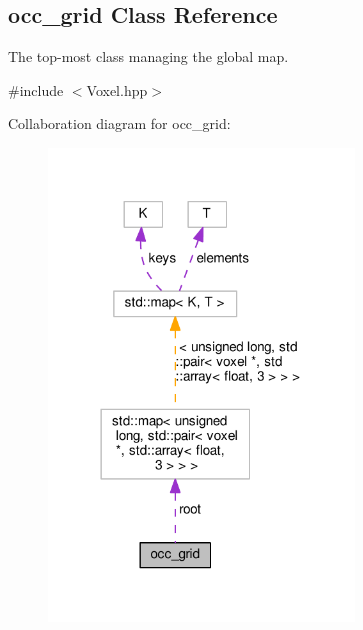 \hypertarget{classocc__grid}{}\subsection{occ\+\_\+grid Class Reference}
\label{classocc__grid}


The top-\/most class managing the global map.  




{\ttfamily \#include $<$Voxel.\+hpp$>$}



Collaboration diagram for occ\+\_\+grid\+:\nopagebreak
\begin{figure}[H]
\begin{center}
\leavevmode
\includegraphics[width=230pt]{classocc__grid__coll__graph}
\end{center}
\end{figure}

